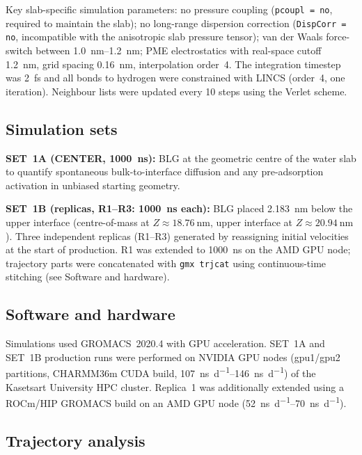 \documentclass[11pt,a4paper]{article}
\begin{document}
Key slab-specific simulation parameters: no pressure coupling
(\texttt{pcoupl = no}, required to maintain the slab); no long-range
dispersion correction (\texttt{DispCorr = no}, incompatible with the
anisotropic slab pressure tensor); van der Waals force-switch between
\SIrange{1.0}{1.2}{\nano\metre}; PME electrostatics\citep{Essmann1995} with real-space
cutoff \SI{1.2}{\nano\metre}, grid spacing \SI{0.16}{\nano\metre},
interpolation order~4. The integration timestep was \SI{2}{\femto\second}
and all bonds to hydrogen were constrained with LINCS\citep{Hess1997}
(order~4, one iteration). Neighbour lists were updated every \num{10} steps
using the Verlet scheme.

\subsection*{Simulation sets}

\textbf{SET~1A (CENTER, \SI{1000}{\nano\second}):} BLG at the geometric
centre of the water slab to quantify spontaneous bulk-to-interface
diffusion and any pre-adsorption activation in unbiased starting geometry.

\textbf{SET~1B (replicas, R1--R3: \SI{1000}{\nano\second} each):}
BLG placed \SI{2.183}{\nano\metre} below the upper interface
(centre-of-mass at $Z \approx \SI{18.76}{\nano\metre}$, upper interface
at $Z \approx \SI{20.94}{\nano\metre}$). Three independent replicas
(R1--R3) generated by reassigning initial velocities at the start of
production. R1 was extended to \SI{1000}{\nano\second} on the AMD GPU node;
trajectory parts were concatenated with \texttt{gmx trjcat} using
continuous-time stitching (see Software and hardware).

\subsection*{Software and hardware}

Simulations used GROMACS~2020.4\citep{Abraham2015} with GPU acceleration.
SET~1A and SET~1B production runs were performed on NVIDIA GPU
nodes (gpu1/gpu2 partitions, CHARMM36m CUDA build,
\SIrange{107}{146}{\nano\second\per\day}) of the Kasetsart University
HPC cluster. Replica~1 was additionally extended using a ROCm/HIP GROMACS
build on an AMD GPU node (\SIrange{52}{70}{\nano\second\per\day}).

\subsection*{Trajectory analysis}
\end{document}
